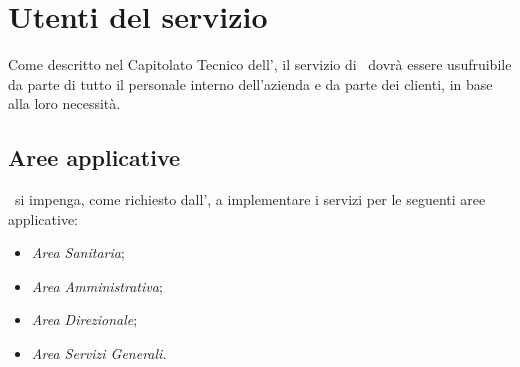 	\newpage
	

\section{Utenti del servizio}\label{sec:utenti}

	Come descritto nel Capitolato Tecnico dell'\istituto, il servizio di \helpdesk~dovrà essere usufruibile da parte di tutto il personale interno dell'azienda e da parte dei clienti, in base alla loro necessità.
	

	\subsection{Aree applicative}
	
		\azienda~si impenga, come richiesto dall'\istituto, a implementare i servizi per le seguenti aree applicative:
		\begin{itemize}[noitemsep]
			\item \textit{Area Sanitaria};
			\item \textit{Area Amministrativa};
			\item \textit{Area Direzionale};
			\item \textit{Area Servizi Generali}.
		\end{itemize}
	
